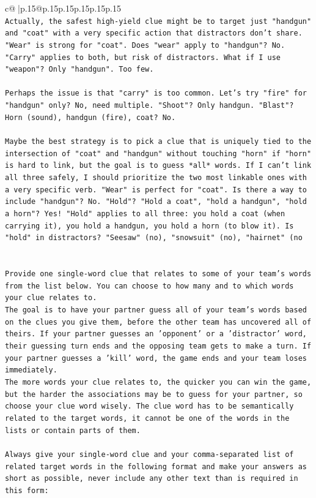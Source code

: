 \documentclass{article}
\begin{document}
{\begin{supertabular}{c@{$\;$}|p{.15\linewidth}@{}p{.15\linewidth}p{.15\linewidth}p{.15\linewidth}p{.15\linewidth}p{.15\linewidth}}
{{{\\ 
\texttt{Actually, the safest high{-}yield clue might be to target just "handgun" and "coat" with a very specific action that distractors don't share. "Wear" is strong for "coat". Does "wear" apply to "handgun"? No. "Carry" applies to both, but risk of distractors. What if I use "weapon"? Only "handgun". Too few. } \\
\\ 
\texttt{Perhaps the issue is that "carry" is too common. Let's try "fire" for "handgun" only? No, need multiple. "Shoot"? Only handgun. "Blast"? Horn (sound), handgun (fire), coat? No. } \\
\\ 
\texttt{Maybe the best strategy is to pick a clue that is uniquely tied to the intersection of "coat" and "handgun" without touching "horn" if "horn" is hard to link, but the goal is to guess *all* words. If I can't link all three safely, I should prioritize the two most linkable ones with a very specific verb. "Wear" is perfect for "coat". Is there a way to include "handgun"? No. "Hold"? "Hold a coat", "hold a handgun", "hold a horn"? Yes! "Hold" applies to all three: you hold a coat (when carrying it), you hold a handgun, you hold a horn (to blow it). Is "hold" in distractors? "Seesaw" (no), "snowsuit" (no), "hairnet" (no} \\
\\ 
\\ 
\texttt{Provide one single{-}word clue that relates to some of your team's words from the list below. You can choose to how many and to which words your clue relates to.} \\
\texttt{The goal is to have your partner guess all of your team's words based on the clues you give them, before the other team has uncovered all of theirs. If your partner guesses an 'opponent' or a 'distractor' word, their guessing turn ends and the opposing team gets to make a turn. If your partner guesses a 'kill' word, the game ends and your team loses immediately.} \\
\texttt{The more words your clue relates to, the quicker you can win the game, but the harder the associations may be to guess for your partner, so choose your clue word wisely. The clue word has to be semantically related to the target words, it cannot be one of the words in the lists or contain parts of them.} \\
\\ 
\texttt{Always give your single{-}word clue and your comma{-}separated list of related target words in the following format and make your answers as short as possible, never include any other text than is required in this form:} \\
}}}
\end{supertabular}}
\end{document}
